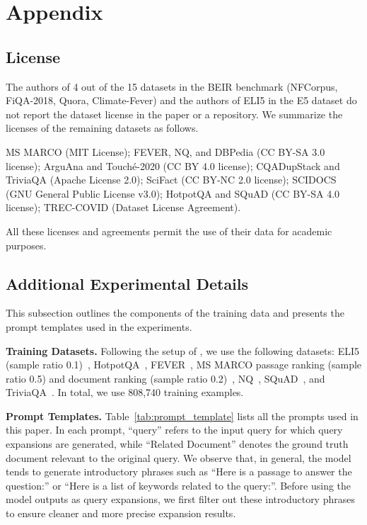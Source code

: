 

\section{Appendix}
\subsection{License}
The authors of 4 out of the 15 datasets in the BEIR benchmark (NFCorpus, FiQA-2018, Quora, Climate-Fever) and the authors of ELI5 in the E5 dataset do not report the dataset license in the paper or a repository. We summarize the licenses of the remaining datasets as follows.

MS MARCO (MIT License); FEVER, NQ, and DBPedia (CC BY-SA 3.0 license); ArguAna and Touché-2020 (CC BY 4.0 license); CQADupStack and TriviaQA (Apache License 2.0); SciFact (CC BY-NC 2.0 license); SCIDOCS (GNU General Public License v3.0); HotpotQA and SQuAD (CC BY-SA 4.0 license); TREC-COVID (Dataset License Agreement).

All these licenses and agreements permit the use of their data for academic purposes.

\subsection{Additional Experimental Details}\label{app:experiment_detail}
This subsection outlines the components of the training data and presents the prompt templates used in the experiments.


\textbf{Training Datasets.} Following the setup of \citet{wang2024improving}, we use the following datasets: ELI5 (sample ratio 0.1)~\cite{fan2019eli5}, HotpotQA~\cite{yang2018hotpotqa}, FEVER~\cite{thorne2018fever}, MS MARCO passage ranking (sample ratio 0.5) and document ranking (sample ratio 0.2)~\cite{bajaj2016ms}, NQ~\cite{karpukhin2020dense}, SQuAD~\cite{karpukhin2020dense}, and TriviaQA~\cite{karpukhin2020dense}. In total, we use 808,740 training examples.

\textbf{Prompt Templates.} Table~\ref{tab:prompt_template} lists all the prompts used in this paper. In each prompt, ``query'' refers to the input query for which query expansions are generated, while ``Related Document'' denotes the ground truth document relevant to the original query. We observe that, in general, the model tends to generate introductory phrases such as ``Here is a passage to answer the question:'' or ``Here is a list of keywords related to the query:''. Before using the model outputs as query expansions, we first filter out these introductory phrases to ensure cleaner and more precise expansion results.



